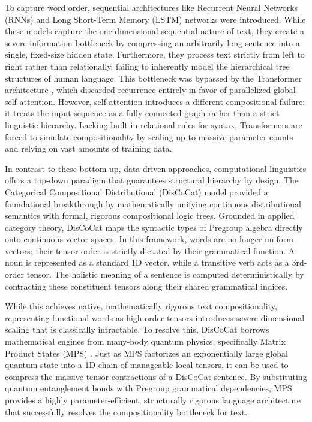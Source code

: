 \documentclass[12pt, a4paper, oneside]{report}
\begin{document}
To capture word order, sequential architectures like Recurrent Neural Networks (RNNs) \cite{rnn} and Long Short-Term Memory (LSTM) \cite{lstm} networks were introduced. While these models capture the one-dimensional sequential nature of text, they create a severe information bottleneck by compressing an arbitrarily long sentence into a single, fixed-size hidden state. Furthermore, they process text strictly from left to right rather than relationally, failing to inherently model the hierarchical tree structures of human language. This bottleneck was bypassed by the Transformer architecture \cite{attention}, which discarded recurrence entirely in favor of parallelized global self-attention. However, self-attention introduces a different compositional failure: it treats the input sequence as a fully connected graph rather than a strict linguistic hierarchy. Lacking built-in relational rules for syntax, Transformers are forced to simulate compositionality by scaling up to massive parameter counts and relying on vast amounts of training data.

In contrast to these bottom-up, data-driven approaches, computational linguistics offers a top-down paradigm that guarantees structural hierarchy by design. The Categorical Compositional Distributional (DisCoCat) model \cite{discocat} provided a foundational breakthrough by mathematically unifying continuous distributional semantics with formal, rigorous compositional logic trees. Grounded in applied category theory, DisCoCat maps the syntactic types of Pregroup algebra \cite{pregroup} directly onto continuous vector spaces. In this framework, words are no longer uniform vectors; their tensor order is strictly dictated by their grammatical function. A noun is represented as a standard 1D vector, while a transitive verb acts as a 3rd-order tensor. The holistic meaning of a sentence is computed deterministically by contracting these constituent tensors along their shared grammatical indices.

While this achieves native, mathematically rigorous text compositionality, representing functional words as high-order tensors introduces severe dimensional scaling that is classically intractable. To resolve this, DisCoCat borrows mathematical engines from many-body quantum physics, specifically Matrix Product States (MPS) \cite{mps_physics}. Just as MPS factorizes an exponentially large global quantum state into a 1D chain of manageable local tensors, it can be used to compress the massive tensor contractions of a DisCoCat sentence. By substituting quantum entanglement bonds with Pregroup grammatical dependencies, MPS provides a highly parameter-efficient, structurally rigorous language architecture that successfully resolves the compositionality bottleneck for text.
\end{document}
